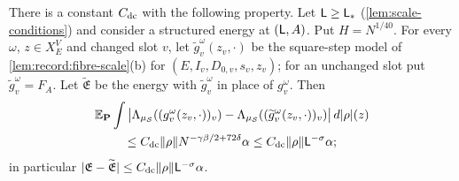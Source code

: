 \begin{lemma}
\label{lem:record:density-dc}
There is a constant $C_{\rm dc}$ with the following property. Let
$\mathsf L\ge\mathsf L_*$ (\cref{lem:scale-conditions}) and consider a structured
energy at $(\mathsf L,A)$. Put $H=N^{1/40}$. For every $\omega$, $z\in X_E^V$ and
changed slot $v$, let $\widetilde g_v^\omega(z_v,\cdot)$ be the square-step
model of \cref{lem:record:fibre-scale}(b) for
$(E,I_v,D_{0,v},s_v,z_v)$; for an unchanged slot put
$\widetilde g_v^\omega=F_A$. Let $\widetilde{\mathfrak E}$ be the energy with
$\widetilde g_v^\omega$ in place of $g_v^\omega$. Then
\begin{multline*}
 \mathbb E_{\mathbf P}\int\big|\Lambda_{\mu_{\mathcal S}}((g_v^\omega(z_v,\cdot))_v)
 -\Lambda_{\mu_{\mathcal S}}((\widetilde g_v^\omega(z_v,\cdot))_v)\big|\,d|\rho|(z)\\
 \le C_{\rm dc}\|\rho\|N^{-\gamma\beta/2+72\delta}\alpha
 \le C_{\rm dc}\|\rho\|\mathsf L^{-\sigma}\alpha ;
\end{multline*}
in particular $|\mathfrak E-\widetilde{\mathfrak E}|\le
C_{\rm dc}\|\rho\|\mathsf L^{-\sigma}\alpha$.
\end{lemma}

